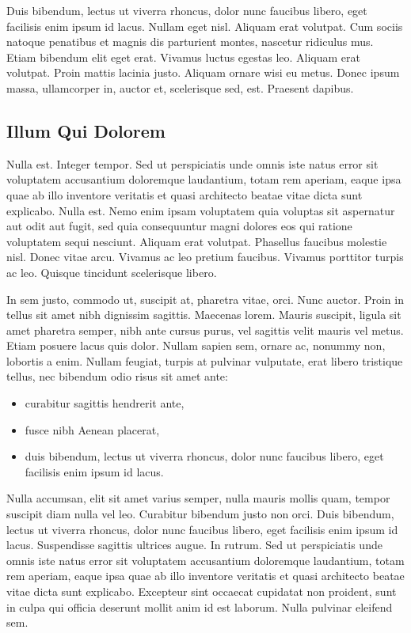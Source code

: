 \documentclass[english,master,dept460,male,cpp,cpdeclaration]{diploma}
\begin{document}
Duis bibendum, lectus ut viverra rhoncus, dolor nunc faucibus libero, eget facilisis enim ipsum id lacus. Nullam eget nisl. Aliquam erat volutpat. Cum sociis natoque penatibus et magnis dis parturient montes, nascetur ridiculus mus. Etiam bibendum elit eget erat. Vivamus luctus egestas leo. Aliquam erat volutpat. Proin mattis lacinia justo. Aliquam ornare wisi eu metus. Donec ipsum massa, ullamcorper in, auctor et, scelerisque sed, est. Praesent dapibus.

\subsection{Illum Qui Dolorem}
Nulla est. Integer tempor. Sed ut perspiciatis unde omnis iste natus error sit voluptatem accusantium doloremque laudantium, totam rem aperiam, eaque ipsa quae ab illo inventore veritatis et quasi architecto beatae vitae dicta sunt explicabo. Nulla est. Nemo enim ipsam voluptatem quia voluptas sit aspernatur aut odit aut fugit, sed quia consequuntur magni dolores eos qui ratione voluptatem sequi nesciunt. Aliquam erat volutpat. Phasellus faucibus molestie nisl. Donec vitae arcu. Vivamus ac leo pretium faucibus. Vivamus porttitor turpis ac leo. Quisque tincidunt scelerisque libero.

In sem justo, commodo ut, suscipit at, pharetra vitae, orci. Nunc auctor. Proin in tellus sit amet nibh dignissim sagittis. Maecenas lorem. Mauris suscipit, ligula sit amet pharetra semper, nibh ante cursus purus, vel sagittis velit mauris vel metus. Etiam posuere lacus quis dolor. Nullam sapien sem, ornare ac, nonummy non, lobortis a enim. Nullam feugiat, turpis at pulvinar vulputate, erat libero tristique tellus, nec bibendum odio risus sit amet ante:
\begin{itemize}
	\item curabitur sagittis hendrerit ante,
	\item fusce nibh Aenean placerat,
	\item duis bibendum, lectus ut viverra rhoncus, dolor nunc faucibus libero, eget facilisis enim ipsum id lacus.
\end{itemize}
Nulla accumsan, elit sit amet varius semper, nulla mauris mollis quam, tempor suscipit diam nulla vel leo. Curabitur bibendum justo non orci. Duis bibendum, lectus ut viverra rhoncus, dolor nunc faucibus libero, eget facilisis enim ipsum id lacus. Suspendisse sagittis ultrices augue. In rutrum. Sed ut perspiciatis unde omnis iste natus error sit voluptatem accusantium doloremque laudantium, totam rem aperiam, eaque ipsa quae ab illo inventore veritatis et quasi architecto beatae vitae dicta sunt explicabo. Excepteur sint occaecat cupidatat non proident, sunt in culpa qui officia deserunt mollit anim id est laborum. Nulla pulvinar eleifend sem.
\end{document}
